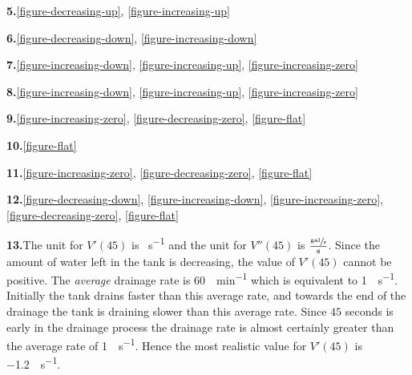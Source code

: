 \documentclass[10pt,oneside,]{book}
\theoremstyle{plain}
\theoremstyle{definition}
\numberwithin{equation}{section}
\newcommand{\fe}[2]{#1\mathopen{}\left(#2\right)\mathclose{}}
\newcommand{\fd}[1]{#1'}
\newcommand{\sd}[1]{#1''}
\begin{document}
\par\smallskip
\noindent\textbf{5.}\quad{}\hyperref[figure-decreasing-up]{\ref{figure-decreasing-up}}, \hyperref[figure-increasing-up]{\ref{figure-increasing-up}}%
\par\smallskip
\noindent\textbf{6.}\quad{}\hyperref[figure-decreasing-down]{\ref{figure-decreasing-down}}, \hyperref[figure-increasing-down]{\ref{figure-increasing-down}}%
\par\smallskip
\noindent\textbf{7.}\quad{}\hyperref[figure-increasing-down]{\ref{figure-increasing-down}}, \hyperref[figure-increasing-up]{\ref{figure-increasing-up}}, \hyperref[figure-increasing-zero]{\ref{figure-increasing-zero}}%
\par\smallskip
\noindent\textbf{8.}\quad{}\hyperref[figure-increasing-down]{\ref{figure-increasing-down}}, \hyperref[figure-increasing-up]{\ref{figure-increasing-up}}, \hyperref[figure-increasing-zero]{\ref{figure-increasing-zero}}%
\par\smallskip
\noindent\textbf{9.}\quad{}\hyperref[figure-increasing-zero]{\ref{figure-increasing-zero}}, \hyperref[figure-decreasing-zero]{\ref{figure-decreasing-zero}}, \hyperref[figure-flat]{\ref{figure-flat}}%
\par\smallskip
\noindent\textbf{10.}\quad{}\hyperref[figure-flat]{\ref{figure-flat}}%
\par\smallskip
\noindent\textbf{11.}\quad{}\hyperref[figure-increasing-zero]{\ref{figure-increasing-zero}}, \hyperref[figure-decreasing-zero]{\ref{figure-decreasing-zero}}, \hyperref[figure-flat]{\ref{figure-flat}}%
\par\smallskip
\noindent\textbf{12.}\quad{}\hyperref[figure-decreasing-down]{\ref{figure-decreasing-down}}, \hyperref[figure-increasing-down]{\ref{figure-increasing-down}}, \hyperref[figure-increasing-zero]{\ref{figure-increasing-zero}}, \hyperref[figure-decreasing-zero]{\ref{figure-decreasing-zero}}, \hyperref[figure-flat]{\ref{figure-flat}}%
\par\smallskip
\noindent\textbf{13.}\quad{}The unit for \(\fe{\fd{V}}{45}\) is \si{\gallon\per\second} and the unit for \(\fe{\sd{V}}{45}\) is \(\frac{\sfrac{\text{gal}}{\text{s}}}{\text{s}}\). Since the amount of water left in the tank is decreasing, the value of \(\fe{\fd{V}}{45}\) cannot be positive. The \emph{average} drainage rate is \SI{60}{\gallon\per\minute} which is equivalent to \SI{1}{\gallon\per\second}. Initially the tank drains faster than this average rate, and towards the end of the drainage the tank is draining slower than this average rate.  Since \(45\) seconds is early in the drainage process the drainage rate is almost certainly greater than the average rate of \SI{1}{\gallon\per\second}.  Hence the most realistic value for \(\fe{\fd{V}}{45}\) is \SI{-1.2}{\gallon\per\second}.%
\end{document}
